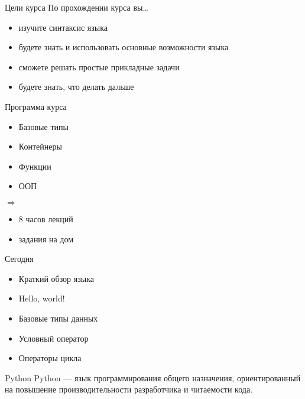 \documentclass[hyperref={pdftex,unicode}]{beamer}
\begin{document}
\begin{frame}{Цели курса}
  По прохождении курса вы\dots
  \begin{itemize}
    \item изучите синтаксис языка
    \item будете знать и использовать основные возможности языка
    \item сможете решать простые прикладные задачи
    \item будете знать, что делать дальше
  \end{itemize}
\end{frame}

\begin{frame}{Программа курса}
  \begin{minipage}{0.4\linewidth}
    \begin{itemize}
    \item Базовые типы
    \item Контейнеры
    \item Функции
    \item ООП
    \end{itemize}
  \end{minipage}
  $ \Longrightarrow $
  \hfill
  \begin{minipage}{0.4\linewidth}
    \begin{itemize}
    \item 8 часов лекций
    \item задания на дом
   \end{itemize}
  \end{minipage}
\end{frame}

\begin{frame}{Сегодня}
  \begin{itemize}
  \item Краткий обзор языка
  \item Hello, world!
  \item Базовые типы данных
  \item Условный оператор
  \item Операторы цикла
  \end{itemize}
\end{frame}

\begin{frame}{Python}
  Python --- язык программирования общего назначения,
  ориентированный на повышение производительности разработчика и читаемости кода.
\end{frame}
\end{document}
